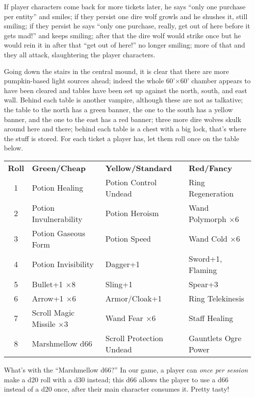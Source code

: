 If player characters come back for more tickets later, he says ``only one
purchase per entity'' and smiles; if they persist one dire wolf growls and he
shushes it, still smiling; if they persist he says ``only one purchase, really,
get out of here before it gets mad!'' and keeps smiling; after that the dire
wolf would strike once but he would rein it in after that ``get out of here!''
no longer smiling; more of that and they all attack, slaughtering the player
characters.

Going down the stairs in the central mound, it is clear that there are more
pumpkin-based light sources ahead; indeed the whole 60'\(\times\)60' chamber
appears to have been cleared and tables have been set up against the north,
south, and east wall. Behind each table is another vampire, although these are
not as talkative; the table to the north has a green banner, the one to the
south has a yellow banner, and the one to the east has a red banner; three more
dire wolves skulk around here and there; behind each table is a chest with a
big lock, that's where the stuff is stored. For each ticket a player has, let
them roll once on the table below.

\begin{tabularx}{\columnwidth}{cZZZ}
\textbf{Roll} & \textbf{Green/Cheap} & \textbf{Yellow/Standard} & \textbf{Red/Fancy}\\
1 & Potion Healing                   & Potion Control Undead    & Ring Regeneration\\
2 & Potion Invulnerability           & Potion Heroism           & Wand Polymorph \(\times\)6\\
3 & Potion Gaseous Form              & Potion Speed             & Wand Cold \(\times\)6\\
4 & Potion Invisibility              & Dagger+1                 & Sword+1, Flaming\\
5 & Bullet+1 \(\times\)8             & Sling+1                  & Spear+3\\
6 & Arrow+1 \(\times\)6              & Armor/Cloak+1            & Ring Telekinesis\\
7 & Scroll Magic Missile \(\times\)3 & Wand Fear \(\times\)6    & Staff Healing\\
8 & Marshmellow d66                  & Scroll Protection Undead & Gauntlets Ogre Power\\
\end{tabularx}

What's with the ``Marshmellow d66?'' In our game, a player can \emph{once per
session} make a d20 roll with a d30 instead; this d66 allows the player to use
a d66 instead of a d20 once, after their main character consumes it. Pretty tasty!

